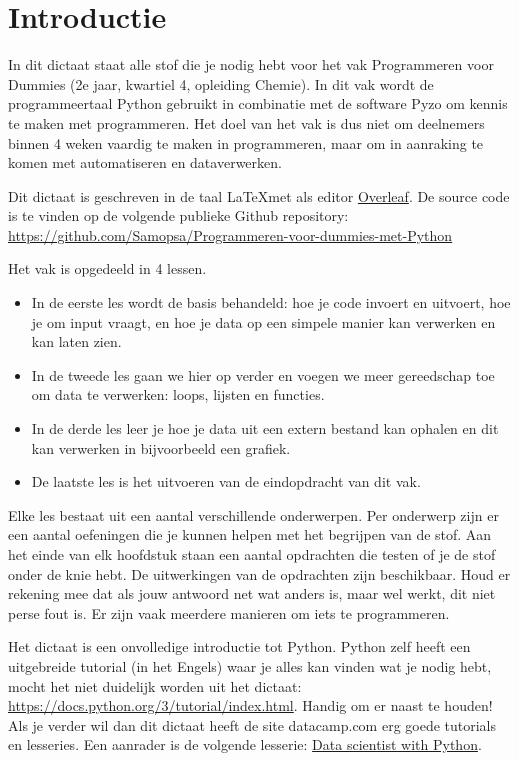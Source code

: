 \chapter*{Introductie}
In dit dictaat staat alle stof die je nodig hebt voor het vak Programmeren voor Dummies (2e jaar, kwartiel 4, opleiding Chemie). In dit vak wordt de programmeertaal Python gebruikt in combinatie met de software Pyzo om kennis te maken met programmeren. Het doel van het vak is dus niet om deelnemers binnen 4 weken vaardig te maken in programmeren, maar om in aanraking te komen met automatiseren en dataverwerken. 

Dit dictaat is geschreven in de taal \LaTeX met als editor \href{https://www.overleaf.com}{Overleaf}. De source code is te vinden op de volgende publieke Github repository: \href{https://github.com/Samopsa/Programmeren-voor-dummies-met-Python}{https://github.com/Samopsa/Programmeren-voor-dummies-met-Python}

Het vak is opgedeeld in 4 lessen.
\begin{itemize}
\item In de eerste les wordt de basis behandeld: hoe je code invoert en uitvoert, hoe je om input vraagt, en hoe je data op een simpele manier kan verwerken en kan laten zien. 
\item In de tweede les gaan we hier op verder en voegen we meer gereedschap toe om data te verwerken: loops, lijsten en functies. 
\item In de derde les leer je hoe je data uit een extern bestand kan ophalen en dit kan verwerken in bijvoorbeeld een grafiek. 
\item De laatste les is het uitvoeren van de eindopdracht van dit vak. 
\end{itemize}

Elke les bestaat uit een aantal verschillende onderwerpen. Per onderwerp zijn er een aantal oefeningen die je kunnen helpen met het begrijpen van de stof. Aan het einde van elk hoofdstuk staan een aantal opdrachten die testen of je de stof onder de knie hebt. De uitwerkingen van de opdrachten zijn beschikbaar. Houd er rekening mee dat als jouw antwoord net wat anders is, maar wel werkt, dit niet perse fout is. Er zijn vaak meerdere manieren om iets te programmeren.

Het dictaat is een onvolledige introductie tot Python. Python zelf heeft een uitgebreide tutorial (in het Engels) waar je alles kan vinden wat je nodig hebt, mocht het niet duidelijk worden uit het dictaat: \href{https://docs.python.org/3/tutorial/index.html}{https://docs.python.org/3/tutorial/index.html}. Handig om er naast te houden! Als je verder wil dan dit dictaat heeft de site datacamp.com erg goede tutorials en lesseries. Een aanrader is de volgende lesserie:
\href{https://www.datacamp.com/tracks/data-scientist-with-python}{Data scientist with Python}.

